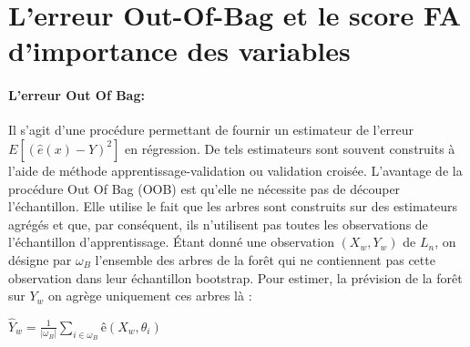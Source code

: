 		
		\section{L'erreur Out-Of-Bag et le score FA d'importance des variables}
\paragraph{L'erreur Out Of Bag:}
	Il s'agit d'une procédure permettant de fournir un estimateur de l'erreur ${E[(\hat{e}(x)-Y)^2]}$ en régression. De tels estimateurs sont souvent construits à l'aide de méthode apprentissage-validation ou validation croisée. L'avantage de la procédure Out Of Bag (OOB) est qu'elle ne nécessite pas de découper
	l'échantillon. Elle utilise le fait que les arbres sont construits sur des estimateurs agrégés et que,
	par conséquent, ils n'utilisent pas toutes les observations de l'échantillon d'apprentissage. Étant donné une observation ${(X_w,Y_w)}$ de $L_n$, on désigne par ${\omega_B}$ l'ensemble des arbres de la forêt qui
	ne contiennent pas cette observation dans leur échantillon bootstrap. Pour estimer, la prévision de
	la forêt sur ${Y_w}$ on agrège uniquement ces arbres là :
	\begin{center}
	$\hat{Y}_w = \frac{1}{|\omega_B|} \sum_{i \in \omega_B} ê(X_w,\theta_i)$
	\end{center}
